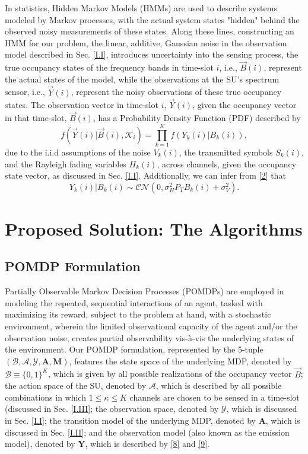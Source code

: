 \documentclass[12pt, draftcls, onecolumn]{IEEEtran}
\begin{document}
In statistics, Hidden Markov Models (HMMs) are used to describe systems modeled by Markov processes, with the actual system states "hidden" behind the observed noisy measurements of these states. Along these lines, constructing an HMM for our problem, the linear, additive, Gaussian noise in the observation model described in Sec. \ref{I.I}, introduces uncertainty into the sensing process, the true occupancy states of the frequency bands in time-slot $i$, i.e., $\vec{B}(i)$, represent the actual states of the model, while the observations at the SU's spectrum sensor, i.e., $\vec{Y}(i)$, represent the noisy observations of these true occupancy states. The observation vector in time-slot $i$, $\vec{Y}(i)$, given the occupancy vector in that time-slot, $\vec{B}(i)$, has a Probability Density Function (PDF) described by
\begin{equation}\label{8}
    f(\vec{Y}(i)|\vec{B}(i),\mathcal{K}_{i})=\prod_{k=1}^{K}f(Y_{k}(i)|B_{k}(i)),
\end{equation}
due to the i.i.d assumptions of the noise $V_{k}(i)$, the transmitted symbols $S_{k}(i)$, and the Rayleigh fading variables $H_{k}(i)$, across channels, given the occupancy state vector, as discussed in Sec. \ref{I.I}. Additionally, we can infer from \eqref{2} that
\begin{equation}\label{9}
    Y_{k}(i)|B_{k}(i)\sim\mathcal{CN}(0,\sigma_{H}^{2}P_{T}B_{k}(i)+\sigma_{V}^{2}).
\end{equation}

\section{Proposed Solution: The Algorithms}\label{II}
\subsection{POMDP Formulation}\label{II.0}
Partially Observable Markov Decision Processes (POMDPs) are employed in modeling the repeated, sequential interactions of an agent, tasked with maximizing its reward, subject to the problem at hand, with a stochastic environment, wherein the limited observational capacity of the agent and/or the observation noise, creates partial observability vis-\`{a}-vis the underlying states of the environment. Our POMDP formulation, represented by the 5-tuple $(\mathcal{B},\mathcal{A},\mathcal{Y},\mathbf{A},\mathbf{M})$, features the state space of the underlying MDP, denoted by $\mathcal{B}{\equiv}\{0,1\}^{K}$, which is given by all possible realizations of the occupancy vector $\vec{B}$; the action space of the SU, denoted by $\mathcal{A}$, which is described by all possible combinations in which $1{\leq}\kappa{\leq}K$ channels are chosen to be sensed in a time-slot (discussed in Sec. \ref{I.III}; the observation space, denoted by $\mathcal{Y}$, which is discussed in Sec. \ref{I.I}; the transition model of the underlying MDP, denoted by $\mathbf{A}$, which is discussed in Sec. \ref{I.II}; and the observation model (also known as the emission model), denoted by $\mathbf{Y}$, which is described by \eqref{8} and \eqref{9}.
\end{document}
